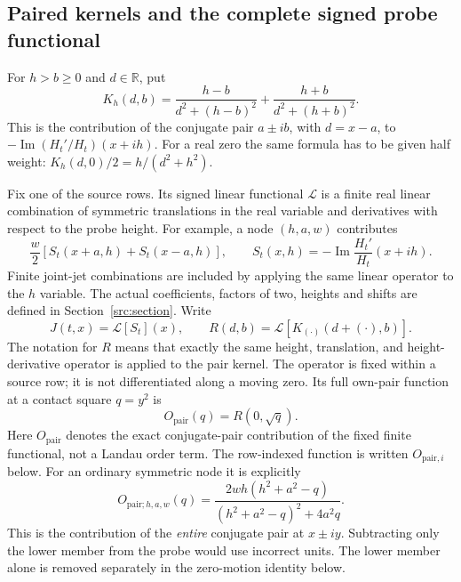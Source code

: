 \documentclass[11pt,a4paper]{article}
\theoremstyle{definition}
\theoremstyle{remark}
\newcommand{\Imm}{\operatorname{Im}}
\begin{document}
\subsection{Paired kernels and the complete signed probe functional}
\label{fnd:kernelinterface}

For $h>b\geq0$ and $d\in\mathbb R$, put
\begin{equation}
 K_h(d,b)=\frac{h-b}{d^2+(h-b)^2}
                 +\frac{h+b}{d^2+(h+b)^2}.
 \label{fnd:K}
\end{equation}
This is the contribution of the conjugate pair $a\pm ib$, with $d=x-a$,
to $-\Imm(H_t'/H_t)(x+ih)$. For a real zero the same formula has to be
given half weight: $K_h(d,0)/2=h/(d^2+h^2)$.

Fix one of the source rows. Its signed linear functional $\mathcal L$
is a finite real linear combination of symmetric translations in the
real variable and derivatives with respect to the probe height.
For example, a node $(h,a,w)$ contributes
\[
 \frac w2\left[S_t(x+a,h)+S_t(x-a,h)\right],\qquad
 S_t(x,h)=-\Imm\frac{H_t'}{H_t}(x+ih).
\]
Finite joint-jet combinations are included by applying the same linear
operator to the $h$ variable. The actual coefficients, factors of two,
heights and shifts are defined in Section~\ref{src:section}. Write
\begin{equation}
 J(t,x)=\mathcal L[S_t](x),\qquad
 R(d,b)=\mathcal L[K_{(\cdot)}(d+(\cdot),b)].
 \label{fnd:functional}
\end{equation}
The notation for $R$ means that exactly the same height, translation,
and height-derivative operator is applied to the pair kernel. The operator
is fixed within a source row; it is not differentiated along a moving
zero. Its full own-pair function at a contact square $q=y^2$ is
\begin{equation}
 O_{\mathrm{pair}}(q)=R(0,\sqrt q).
 \label{fnd:own}
\end{equation}
Here $O_{\mathrm{pair}}$ denotes the exact conjugate-pair contribution of
the fixed finite functional, not a Landau order term. The row-indexed
function is written $O_{\mathrm{pair},i}$ below.
For an ordinary symmetric node it is explicitly
\begin{equation}
 O_{\mathrm{pair};h,a,w}(q)
 =\frac{2wh(h^2+a^2-q)}{(h^2+a^2-q)^2+4a^2q}.
 \label{fnd:ownnode}
\end{equation}
This is the contribution of the \emph{entire} conjugate pair at $x\pm iy$.
Subtracting only the lower member from the probe would use incorrect
units. The lower member alone is removed separately in the zero-motion
identity below.
\end{document}
